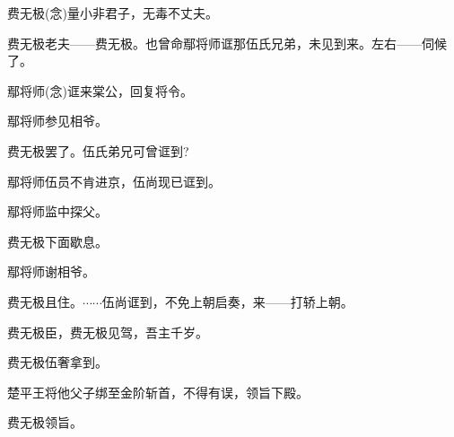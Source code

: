 {

\vspace{5pt}


\vspace{5pt}

费无极\hspace{20pt}({\akai 念})量小非君子，无毒不丈夫。

费无极\hspace{20pt}老夫------费无极。也曾命鄢将师诓那伍氏兄弟，未见到来。左右------伺候了。

鄢将师\hspace{20pt}({\akai 念})诓来棠公，回复将令。

鄢将师\hspace{20pt}参见相爷。

费无极\hspace{20pt}罢了。伍氏弟兄可曾诓到?

鄢将师\hspace{20pt}伍员不肯进京，伍尚现已诓到。

鄢将师\hspace{20pt}监中探父。

费无极\hspace{20pt}下面歇息。

鄢将师\hspace{20pt}谢相爷。

费无极\hspace{20pt}且住。$\cdots{}\cdots{}$伍尚诓到，不免上朝启奏，来------打轿上朝。

费无极\hspace{20pt}臣，费无极见驾，吾主千岁。

费无极\hspace{20pt}伍奢拿到。

楚平王\hspace{20pt}将他父子绑至金阶斩首，不得有误，领旨下殿。

费无极\hspace{20pt}领旨。

}
